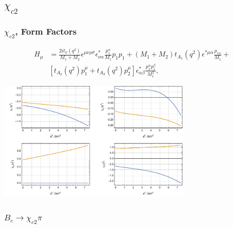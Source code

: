 \documentclass{beamer}
\begin{document}
\subsection{$\chi_{c2}$}
\begin{frame}
  \frametitle{$\chi_{c2}$, Form Factors}
  \begin{align*}
  H_\mu &=
\frac{2it_V(q^2)}{M_1+M_2} \epsilon^{\mu\nu\rho\sigma}\epsilon^*_{\nu\alpha}
          \frac{p_1^\alpha}{M_1}  p_1 p_1  
     +  (M_1+M_2)t_{A_1}(q^2)\epsilon^{*\mu\alpha}\frac{p_{1\alpha}}{M_1} +\\
&  [t_{A_2}(q^2)p_1^\mu+t_{A_3}(q^2)p_2^\mu]\epsilon^*_{\alpha\beta}
\frac{p_1^\alpha p_1^\beta}{M_1^2} , 
  \end{align*}

\begin{center}
  \includegraphics[width=0.7\textwidth]{figs/ff_chi_c2}
\end{center}
\end{frame}

\begin{frame}
  \frametitle{$B_c \to \chi_{c2} \pi$}
  \begin{columns}
    \begin{column}{0.5\textwidth}
      \centering{[Ebert]:}
      
    \end{column}
    \begin{column}{0.5\textwidth}
      \centering{[Wang]:}
      
    \end{column}
  \end{columns}
\end{frame}
\end{document}
